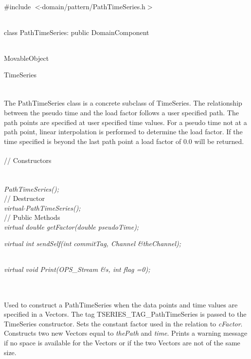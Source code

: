 
   \\
\#include $<\tilde{ }$domain/pattern/PathTimeSeries.h$>$  


  \\
class PathTimeSeries: public DomainComponent  


 \\
MovableObject 

\indent\indent TimeSeries \\
\indent\indent{} \\

 \\ 
\indent The PathTimeSeries class is a concrete subclass of TimeSeries.
The relationship between the pseudo time and the load factor follows
a user specified path. The path points are specified at user specified
time values. For a pseudo time not at a path point, linear interpolation
is performed to determine the load factor. If the time specified is
beyond the last path point a load factor of $0.0$ will be returned.\\

 \\
\indent // Constructors \\ 
\\ 
\\ 
{\em PathTimeSeries();}\\ 

\indent // Destructor \\ 
{\em virtual $\tilde{ }$PathTimeSeries();}\\  

\indent // Public Methods \\ 
{\em  virtual double getFactor(double pseudoTime);}

{\em  virtual int sendSelf(int commitTag, Channel \&theChannel);}

\\
{\em  virtual void Print(OPS_Stream \&s, int flag =0);}


 \\ 
\\ 
Used to construct a PathTimeSeries when the data points and time
values are specified in a Vectors. The tag
TSERIES\_TAG\_PathTimeSeries is passed to the TimeSeries 
constructor. Sets the constant factor used in the relation to {\em
cFactor}. Constructs two new Vectors equal to {\em thePath} and {\em
time}. Prints a warning message if no space is available for the
Vectors or if the two Vectors are not of the same size.\\ 

